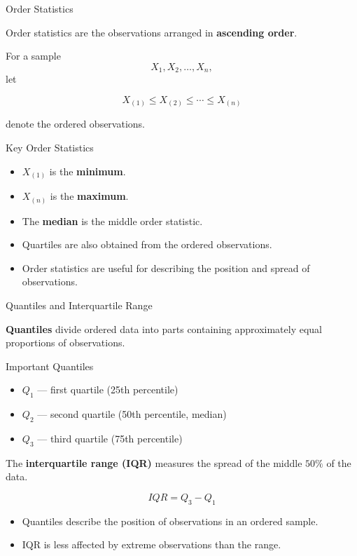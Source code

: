 \documentclass{beamer}
\begin{document}
\begin{frame}{Order Statistics}

Order statistics are the observations arranged in
\textbf{ascending order}.

For a sample
\[
X_1,X_2,\ldots,X_n,
\]
let

\[
X_{(1)} \leq X_{(2)} \leq \cdots \leq X_{(n)}
\]

denote the ordered observations.

\begin{block}{Key Order Statistics}
\begin{itemize}
    \item $X_{(1)}$ is the \textbf{minimum}.
    \item $X_{(n)}$ is the \textbf{maximum}.
    \item The \textbf{median} is the middle order statistic.
    \item Quartiles are also obtained from the ordered observations.
\end{itemize}
\end{block}

\begin{itemize}
    \item Order statistics are useful for describing the position
          and spread of observations.
\end{itemize}

\end{frame}


\begin{frame}{Quantiles and Interquartile Range}

\textbf{Quantiles} divide ordered data into parts containing
approximately equal proportions of observations.

\begin{block}{Important Quantiles}
\begin{itemize}
    \item $Q_1$ — first quartile (25th percentile)
    \item $Q_2$ — second quartile (50th percentile, median)
    \item $Q_3$ — third quartile (75th percentile)
\end{itemize}
\end{block}

\vspace{0.2cm}

The \textbf{interquartile range (IQR)} measures the spread of the
middle $50\%$ of the data.

\[
\boxed{
IQR=Q_3-Q_1
}
\]

\begin{itemize}
    \item Quantiles describe the position of observations in an
          ordered sample.
    \item IQR is less affected by extreme observations than the range.
\end{itemize}

\end{frame}
\end{document}
